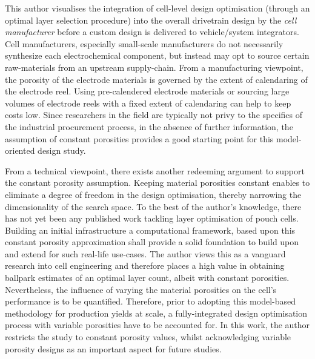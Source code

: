 This  author  visualises  the  integration  of  cell-level  design  optimisation
(through  an optimal  layer  selection procedure)  into  the overall  drivetrain
design  by the  \emph{cell manufacturer}  before  a custom  design is  delivered
to  vehicle/system  integrators.   Cell  manufacturers,  especially  small-scale
manufacturers do not necessarily  synthesize each electrochemical component, but
instead may opt  to source certain raw-materials from  an upstream supply-chain.
From  a  manufacturing  viewpoint,  the  porosity  of  the  electrode  materials
is  governed  by  the  extent  of  calendaring  of  the  electrode  reel.  Using
pre-calendered electrode materials or sourcing  large volumes of electrode reels
with a fixed extent of calendaring can help to keep costs low. Since researchers
in  the  field are  typically  not  privy to  the  specifics  of the  industrial
procurement process,  in the absence  of further information, the  assumption of
constant  porosities provides  a  good starting  point  for this  model-oriented
design study.

From a technical  viewpoint, there exists another redeeming  argument to support
the constant  porosity assumption. Keeping material  porosities constant enables
to eliminate a  degree of freedom in the design  optimisation, thereby narrowing
the dimensionality of  the search space. To the best  of the author's knowledge,
there has not  yet been any published work tackling  layer optimisation of pouch
cells.  Building an  initial  infrastructure \viz{}  a computational  framework,
based upon this constant porosity approximation shall provide a solid foundation
to build upon and extend for such  real-life use-cases. The author views this as
a vanguard research  into cell engineering and therefore places  a high value in
obtaining ballpark  estimates of  an optimal layer  count, albeit  with constant
porosities. Nevertheless,  the influence of  varying the material  porosities on
the cell's  performance is to be  quantified. Therefore, prior to  adopting this
model-based  methodology  for production  yields  at  scale, a  fully-integrated
design optimisation process  with variable porosities have to  be accounted for.
In this work, the author restricts the study to constant porosity values, whilst
acknowledging  variable  porosity designs  as  an  important aspect  for  future
studies.

